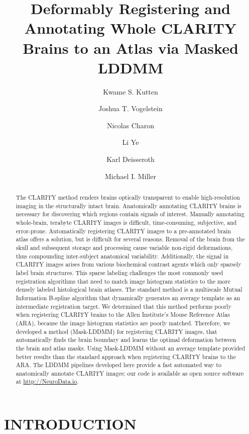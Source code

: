 \documentclass[]{spie}  %
\title{Deformably Registering and Annotating Whole CLARITY Brains to an Atlas via Masked LDDMM}
\author[a]{Kwame S. Kutten}
\author[a,c]{Joshua T. Vogelstein}
\author[b]{Nicolas Charon}
\author[d]{Li Ye}
\author[d]{Karl Deisseroth}
\author[a]{Michael I. Miller}
\affil[a]{Department of Biomedical Engineering, Johns Hopkins University}
\affil[b]{Department of Applied Mathematics \& Statistics, Johns Hopkins University}
\affil[c]{Institute for Computational Medicine, Johns Hopkins University}
\affil[d]{Department of Bioengineering, Stanford University}
\begin{document}
 
\maketitle

\begin{abstract}
The CLARITY method renders brains optically transparent to enable high-resolution imaging in the structurally intact brain.
Anatomically annotating CLARITY brains is necessary for discovering which regions contain signals of interest.
Manually annotating whole-brain, terabyte CLARITY images is difficult, time-consuming, subjective, and error-prone.
Automatically registering CLARITY images to a pre-annotated brain atlas offers a solution, but is difficult for several reasons.
Removal of the brain from the skull and subsequent storage and processing cause variable non-rigid deformations, thus compounding inter-subject anatomical variability.
Additionally, the signal in CLARITY images arises from various biochemical contrast agents which only sparsely label brain structures.
This sparse labeling challenges the most commonly used registration algorithms that need to match image histogram statistics to the more densely labeled histological brain atlases.
The standard method is a multiscale Mutual Information B-spline algorithm that dynamically generates an average template as an intermediate registration target. 
We determined that this method performs poorly when registering CLARITY brains to the Allen Institute's Mouse Reference Atlas (ARA), because the image histogram statistics are poorly matched.
Therefore, we developed a method (Mask-LDDMM) for registering CLARITY images, that automatically finds the brain boundary and learns the optimal deformation between the brain and atlas masks.
Using Mask-LDDMM without an average template provided better results than the standard approach when registering CLARITY brains to the ARA.
The LDDMM pipelines developed here provide a fast automated way to anatomically annotate CLARITY images; our code is available as open source software at \url{http://NeuroData.io}. 


\end{abstract}


\section{INTRODUCTION}
\label{sec:intro}  %
\end{document}
